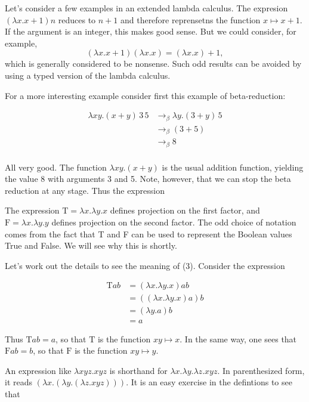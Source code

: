 Let's consider a few examples in an extended lambda calculus.  The expresion $(\lambda x.x+1)n$ reduces to $n+1$ and therefore reprensetns the function $x \mapsto x + 1$.  If the argument is an integer, this makes good sense.  But we could consider, for example,
$$
  (\lambda x.x + 1)(\lambda x.x) = (\lambda x.x) + 1,
$$
which is generally considered to be nonsense.  Such odd results can be avoided by using a typed version of the lambda calculus.

For a more interesting example consider first this example of beta-reduction:

\begin{align}
  \lambda x y.(x + y)\, 3\, 5 &\to_\beta \lambda y.(3 + y)\, 5 \\
      &\to_\beta (3 + 5) \\
    &\to_\beta 8 \\
\end{align}

All very good.  The function $\lambda xy.(x+y)$ is the usual addition function, yielding the value 8 with arguments 3 and 5.  Note, however, that we can stop the beta reduction at any stage.  Thus the expression

The expression $\text{T} = \lambda x.\lambda y . x$ defines projection on the first factor, and $\text{F} = \lambda x.\lambda y . y$ defines projection on the second factor.  The odd choice of notation comes from the fact that T and F can be used to represent the Boolean values True and False.  We will see why this is shortly.





Let's work out the details to see the meaning of (3).  Consider the expression

\begin{align}
 \text{T}ab &= (\lambda x.\lambda y . x)ab \\
 &= ((\lambda x.\lambda y . x)a)b  \\
&= (\lambda y.a) b \\
&= a
\end{align}

Thus $ \text{T}ab = a$, so that $ \text{T}$ is the function $xy \mapsto x$.  In the same way, one sees that $ \text{F}ab = b$, so that $ \text{F}$ is the function $xy \mapsto y$.


An expression like $\lambda xyz.xyz$ is shorthand for $\lambda x. \lambda y. \lambda z. xyz$.  In parenthesized form, it reads $(\lambda x.(\lambda y.(\lambda z.xyz)))$. It is an easy exercise in the defintions to see that

